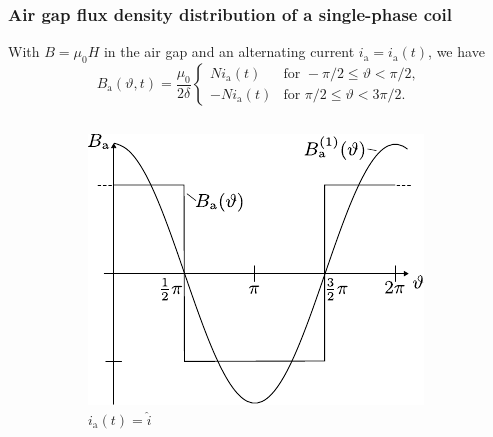 \begin{frame}
	\frametitle{Air gap flux density distribution of a single-phase coil}
    With $B=\mu_0 H$ in the air gap and an alternating current $i_\mathrm{a} = i_\mathrm{a}(t)$, we have
    \begin{equation}
        B_\mathrm{a}(\vartheta, t) = \frac{\mu_0}{2\delta} \begin{cases}
            N i_\mathrm{a}(t) & \text{for } -\pi/2 \leq \vartheta < \pi/2, \\
            -N i_\mathrm{a}(t) & \text{for } \pi/2 \leq \vartheta < 3\pi/2.
        \end{cases}
    \end{equation}
    \pause
    \begin{figure}
        \begin{columns}
            \begin{column}{0.7\textwidth}
                \centering
		\begin{subfigure}[b]{0.45\textwidth}
			\centering
			\includegraphics[width=\textwidth]{fig/lec05/B_single_phase_full_current.pdf}
			\caption{$i_\mathrm{a}(t) = \hat{i}$}
		\end{subfigure}
		\hfill
        \pause
		\begin{subfigure}[b]{0.45\textwidth}
			\centering

\end{subfigure}
\end{column}
\end{columns}
\end{figure}
\end{frame}
